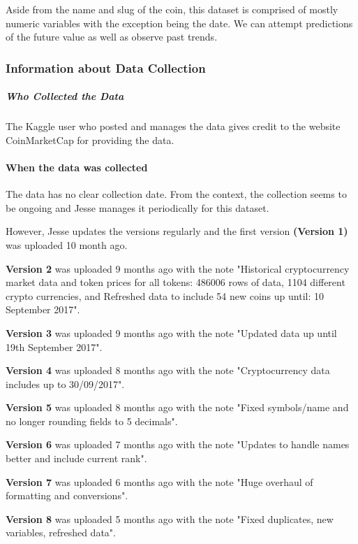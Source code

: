 \documentclass[11pt]{article}
\begin{document}
Aside from the name and slug of the coin, this dataset is comprised of
mostly numeric variables with the exception being the date. We can
attempt predictions of the future value as well as observe past trends.

    \subsubsection{Information about Data
Collection}\label{information-about-data-collection}

    \subparagraph{Who Collected the Data}\label{who-collected-the-data}

    The Kaggle user who posted and manages the data gives credit to the
website CoinMarketCap for providing the data.

    \paragraph{When the data was
collected}\label{when-the-data-was-collected}

    The data has no clear collection date. From the context, the collection
seems to be ongoing and Jesse manages it periodically for this dataset.

However, Jesse updates the versions regularly and the first version
\textbf{(Version 1)} was uploaded 10 month ago.

\textbf{Version 2} was uploaded 9 months ago with the note "Historical
cryptocurrency market data and token prices for all tokens: 486006 rows
of data, 1104 different crypto currencies, and Refreshed data to include
54 new coins up until: 10 September 2017".

\textbf{Version 3} was uploaded 9 months ago with the note "Updated data
up until 19th September 2017".

\textbf{Version 4} was uploaded 8 months ago with the note
"Cryptocurrency data includes up to 30/09/2017".

\textbf{Version 5} was uploaded 8 months ago with the note "Fixed
symbols/name and no longer rounding fields to 5 decimals".

\textbf{Version 6} was uploaded 7 months ago with the note "Updates to
handle names better and include current rank".

\textbf{Version 7} was uploaded 6 months ago with the note "Huge
overhaul of formatting and conversions".

\textbf{Version 8} was uploaded 5 months ago with the note "Fixed
duplicates, new variables, refreshed data".
\end{document}
